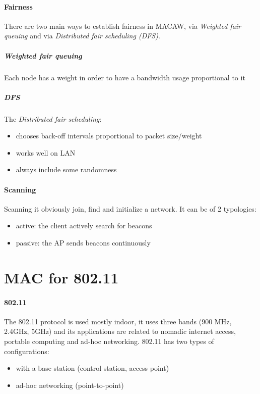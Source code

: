 \paragraph*{Fairness}
There are two main ways to establish fairness in MACAW, via \textit{Weighted
  fair queuing} and via \textit{Distributed fair scheduling (DFS)}.

\subparagraph*{Weighted fair queuing} Each node has a weight in order to have a
bandwidth usage proportional to it

\subparagraph*{DFS} The \textit{Distributed fair scheduling}:
\begin{itemize}
\item chooses back-off intervals proportional to packet size/weight
\item works well on LAN
\item always include some randomness
\end{itemize}

\paragraph*{Scanning} Scanning it obviously join, find and initialize a network.
It can be of 2 typologies:
\begin{itemize}
\item active: the client actively search for beacons
\item passive: the AP sends beacons continuously
\end{itemize}

\section{MAC for 802.11}
\paragraph*{802.11} The 802.11 protocol is used mostly indoor, it uses three
bands (900 MHz, 2.4GHz, 5GHz) and its applications are related to nomadic
internet access, portable computing and ad-hoc networking.
802.11 has two types of configurations:
\begin{itemize}
\item with a base station (control station, access point)
\item ad-hoc networking (point-to-point)
\end{itemize}

